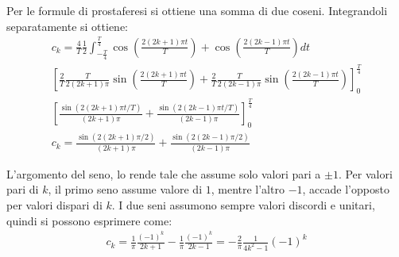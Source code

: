 \documentclass{article}
\numberwithin{equation}{subsection}
\begin{document}
Per le formule di prostaferesi si ottiene una somma di due coseni. Integrandoli separatamente si ottiene:
\begin{gather*}
    c_k=\displaystyle\frac{4}{T}\frac{1}{2}\int_{-\frac{T}{4}}^{\frac{T}{4}}\cos\left(\frac{2(2k+1)\pi t}{T}\right)+\cos\left(\frac{2(2k-1)\pi t}{T}\right)dt\\
    \displaystyle\left[\frac{2}{T}\frac{T}{2(2k+1)\pi}\sin\left(\frac{2(2k+1)\pi t}{T}\right)+
    \frac{2}{T}\frac{T}{2(2k-1)\pi}\sin\left(\frac{2(2k-1)\pi t}{T}\right)\right]_{0}^{\frac{T}{4}}\\
    \left[\displaystyle\frac{\sin(2(2k+1)\pi t/T)}{(2k+1)\pi}+\frac{\sin(2(2k-1)\pi t/T)}{(2k-1)\pi}\right]_0^{\frac{T}{4}}\\
    c_k=\displaystyle\frac{\sin(2(2k+1)\pi/2)}{(2k+1)\pi}+\frac{\sin(2(2k-1)\pi/2)}{(2k-1)\pi}
\end{gather*}

L'argomento del seno, lo rende tale che assume solo valori pari a $\pm1$. Per valori pari di $k$, il primo seno assume valore di $1$, mentre l'altro $-1$, accade l'opposto per 
valori dispari di $k$. 
I due seni assumono sempre valori discordi e unitari, quindi si possono esprimere come: 
\begin{gather*}
    c_k=\displaystyle\frac{1}{\pi}\frac{(-1)^k}{2k+1}-\frac{1}{\pi}\frac{(-1)^k}{2k-1}=-\frac{2}{\pi}\frac{1}{4k^2-1}(-1)^k
\end{gather*}
\end{document}
